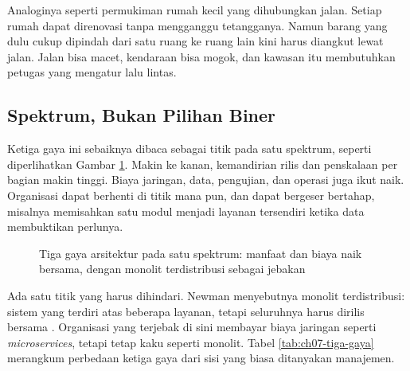 Analoginya seperti permukiman rumah kecil yang dihubungkan jalan. Setiap rumah dapat direnovasi
tanpa mengganggu tetangganya. Namun barang yang dulu cukup dipindah dari satu ruang ke ruang lain
kini harus diangkut lewat jalan. Jalan bisa macet, kendaraan bisa mogok, dan kawasan itu membutuhkan
petugas yang mengatur lalu lintas.

\subsection{Spektrum, Bukan Pilihan Biner}

Ketiga gaya ini sebaiknya dibaca sebagai titik pada satu spektrum, seperti diperlihatkan Gambar
\ref{fig:ch07-spektrum}. Makin ke kanan, kemandirian rilis dan penskalaan per bagian makin tinggi.
Biaya jaringan, data, pengujian, dan operasi juga ikut naik. Organisasi dapat berhenti di titik mana
pun, dan dapat bergeser bertahap, misalnya memisahkan satu modul menjadi layanan tersendiri ketika
data membuktikan perlunya.

\begin{figure}[!htb]
  \centering
  
  \caption{Tiga gaya arsitektur pada satu spektrum: manfaat dan biaya naik
           bersama, dengan monolit terdistribusi sebagai jebakan}
  \label{fig:ch07-spektrum}
\end{figure}

Ada satu titik yang harus dihindari. Newman menyebutnya monolit terdistribusi: sistem yang terdiri
atas beberapa layanan, tetapi seluruhnya harus dirilis bersama \cite{newman2021}. Organisasi yang
terjebak di sini membayar biaya jaringan seperti \textit{microservices}, tetapi tetap kaku seperti
monolit. Tabel \ref{tab:ch07-tiga-gaya} merangkum perbedaan ketiga gaya dari sisi yang biasa
ditanyakan manajemen.

